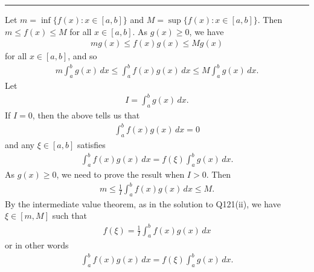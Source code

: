 \documentclass[letterpaper,10pt,english]{jupyterBook}
\begin{document}
\bigskip\hrule\bigskip


\sphinxAtStartPar
{\hyperref[\detokenize{Problems:id76}]{}} Let  \(m = \inf \{ f(x) : x\in [a,b] \}\) and \(M = \sup \{ f(x) : x\in [a,b] \}\). Then \(m\leq f(x)\leq M\) for all \(x\in [a,b]\). As \(g(x)\geq 0\), we have
\begin{equation*}
\begin{split}
mg(x)\leq f(x)g(x)\leq Mg(x)
\end{split}
\end{equation*}
\sphinxAtStartPar
for all \(x\in [a,b]\), and so
\begin{equation*}
\begin{split}
m \int_a^b g(x)\, dx \leq \int_a^b f(x)g(x)\, dx \leq M\int_a^b g(x)\, dx.
\end{split}
\end{equation*}
\sphinxAtStartPar
Let
\begin{equation*}
\begin{split}
I= \int_a^b g(x)\, dx.
\end{split}
\end{equation*}
\sphinxAtStartPar
If \(I=0\), then the above tells us that
\begin{equation*}
\begin{split}
\int_a^b f(x)g(x)\, dx =0
\end{split}
\end{equation*}
\sphinxAtStartPar
and any \(\xi \in [a,b]\) satisfies
\begin{equation*}
\begin{split}
\int_a^b f(x)g(x)\, dx = f(\xi ) \int_a^b g(x)\, dx .
\end{split}
\end{equation*}
\sphinxAtStartPar
As \(g(x)\geq 0\), we need to prove the result when \(I>0\). Then
\begin{equation*}
\begin{split}
m \leq \frac{1}{I} \int_a^b f(x)g(x)\, dx \leq M.
\end{split}
\end{equation*}
\sphinxAtStartPar
By the intermediate value theorem, as in the solution to Q121(ii), we have \(\xi \in [m,M]\) such that
\begin{equation*}
\begin{split}
f(\xi ) = \frac{1}{I}  \int_a^b f(x)g(x)\, dx
\end{split}
\end{equation*}
\sphinxAtStartPar
or in other words
\begin{equation*}
\begin{split}
\int_a^b f(x)g(x)\, dx = f(\xi ) \int_a^b g(x)\, dx .
\end{split}
\end{equation*}
\end{document}
